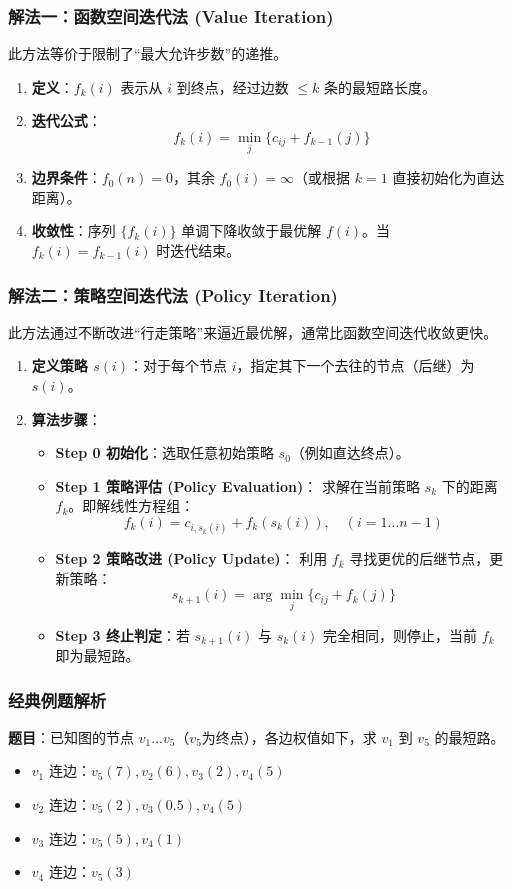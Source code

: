 \documentclass[a4paper,12pt]{ctexart} %
\begin{document}
	\subsubsection{解法一：函数空间迭代法 (Value Iteration)}
	此方法等价于限制了“最大允许步数”的递推。
	\begin{enumerate}
		\item \textbf{定义}：$f_k(i)$ 表示从 $i$ 到终点，经过边数 $\le k$ 条的最短路长度。
		\item \textbf{迭代公式}：
		\[
		f_k(i) = \min_{j} \{ c_{ij} + f_{k-1}(j) \}
		\]
		\item \textbf{边界条件}：$f_0(n)=0$，其余 $f_0(i)=\infty$（或根据 $k=1$ 直接初始化为直达距离）。
		\item \textbf{收敛性}：序列 $\{f_k(i)\}$ 单调下降收敛于最优解 $f(i)$。当 $f_k(i) = f_{k-1}(i)$ 时迭代结束。
	\end{enumerate}
	
	\subsubsection{解法二：策略空间迭代法 (Policy Iteration)}
	此方法通过不断改进“行走策略”来逼近最优解，通常比函数空间迭代收敛更快。
	
	\begin{enumerate}
		\item \textbf{定义策略 $s(i)$}：对于每个节点 $i$，指定其下一个去往的节点（后继）为 $s(i)$。
		\item \textbf{算法步骤}：
		\begin{itemize}
			\item \textbf{Step 0 初始化}：选取任意初始策略 $s_0$（例如直达终点）。
			\item \textbf{Step 1 策略评估 (Policy Evaluation)}：
			求解在当前策略 $s_k$ 下的距离 $f_k$。即解线性方程组：
			\[
			f_k(i) = c_{i, s_k(i)} + f_k(s_k(i)), \quad (i=1 \dots n-1)
			\]
			\item \textbf{Step 2 策略改进 (Policy Update)}：
			利用 $f_k$ 寻找更优的后继节点，更新策略：
			\[
			s_{k+1}(i) = \arg\min_{j} \{ c_{ij} + f_k(j) \}
			\]
			\item \textbf{Step 3 终止判定}：若 $s_{k+1}(i)$ 与 $s_k(i)$ 完全相同，则停止，当前 $f_k$ 即为最短路。
		\end{itemize}
	\end{enumerate}
	
	\subsubsection{经典例题解析}
	\textbf{题目}：已知图的节点 $v_1 \dots v_5$（$v_5$为终点），各边权值如下，求 $v_1$ 到 $v_5$ 的最短路。
	\begin{itemize}
		\item $v_1$ 连边：$v_5(7), v_2(6), v_3(2), v_4(5)$
		\item $v_2$ 连边：$v_5(2), v_3(0.5), v_4(5)$
		\item $v_3$ 连边：$v_5(5), v_4(1)$
		\item $v_4$ 连边：$v_5(3)$
	\end{itemize}
	
\end{document}
